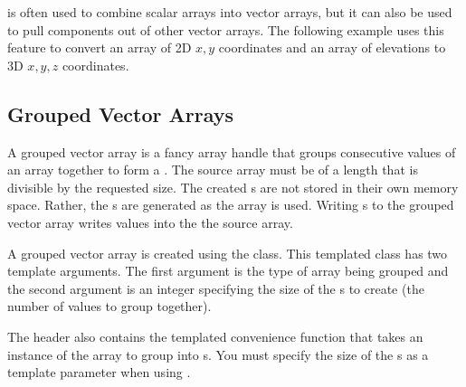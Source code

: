 
 is often used to combine scalar
arrays into vector arrays, but it can also be used to pull components out
of other vector arrays. The following example uses this feature to convert
an array of 2D $x,y$ coordinates and an array of elevations to 3D $x,y,z$
coordinates.



\subsection{Grouped Vector Arrays}
\label{sec:GroupedVectorArrays}


A grouped vector array is a fancy array handle that groups consecutive
values of an array together to form a . The source array must be
of a length that is divisible by the requested  size.
The created s are not stored in their own memory space. Rather,
the s are generated as the array is used. Writing
s to the grouped vector array writes values into the
the source array.

A grouped vector array is created using the 
class. This templated class has two template arguments. The first argument
is the type of array being grouped and the second argument is an integer
specifying the size of the s to create (the number of
values to group together).


The  header also contains the
templated convenience function  that
takes an instance of the array to group into s. You
must specify the size of the s as a template parameter
when using .


